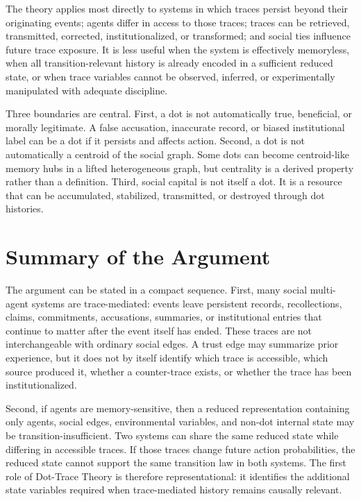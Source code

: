 \documentclass[11pt]{article}
\theoremstyle{remark}
\begin{document}
The theory applies most directly to systems in which traces persist beyond their originating events; agents differ in access to those traces; traces can be retrieved, transmitted, corrected, institutionalized, or transformed; and social ties influence future trace exposure. It is less useful when the system is effectively memoryless, when all transition-relevant history is already encoded in a sufficient reduced state, or when trace variables cannot be observed, inferred, or experimentally manipulated with adequate discipline.

Three boundaries are central. First, a dot is not automatically true, beneficial, or morally legitimate. A false accusation, inaccurate record, or biased institutional label can be a dot if it persists and affects action. Second, a dot is not automatically a centroid of the social graph. Some dots can become centroid-like memory hubs in a lifted heterogeneous graph, but centrality is a derived property rather than a definition. Third, social capital is not itself a dot. It is a resource that can be accumulated, stabilized, transmitted, or destroyed through dot histories.

\section{Summary of the Argument}\label{summary-of-the-argument}

The argument can be stated in a compact sequence. First, many social multi-agent systems are trace-mediated: events leave persistent records, recollections, claims, commitments, accusations, summaries, or institutional entries that continue to matter after the event itself has ended. These traces are not interchangeable with ordinary social edges. A trust edge may summarize prior experience, but it does not by itself identify which trace is accessible, which source produced it, whether a counter-trace exists, or whether the trace has been institutionalized.

Second, if agents are memory-sensitive, then a reduced representation containing only agents, social edges, environmental variables, and non-dot internal state may be transition-insufficient. Two systems can share the same reduced state while differing in accessible traces. If those traces change future action probabilities, the reduced state cannot support the same transition law in both systems. The first role of Dot-Trace Theory is therefore representational: it identifies the additional state variables required when trace-mediated history remains causally relevant.
\end{document}
